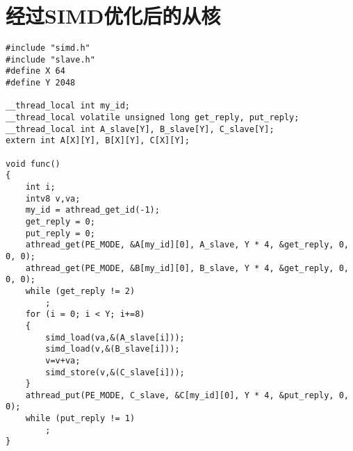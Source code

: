 \section{经过SIMD优化后的从核}\label{apdx:优化后的第一个程序从核}
\begin{lstlisting}
#include "simd.h"
#include "slave.h"
#define X 64
#define Y 2048

__thread_local int my_id;
__thread_local volatile unsigned long get_reply, put_reply;
__thread_local int A_slave[Y], B_slave[Y], C_slave[Y];
extern int A[X][Y], B[X][Y], C[X][Y];

void func()
{
    int i;
    intv8 v,va;
    my_id = athread_get_id(-1);
    get_reply = 0;
    put_reply = 0;
    athread_get(PE_MODE, &A[my_id][0], A_slave, Y * 4, &get_reply, 0, 0, 0);
    athread_get(PE_MODE, &B[my_id][0], B_slave, Y * 4, &get_reply, 0, 0, 0);
    while (get_reply != 2)
        ;
    for (i = 0; i < Y; i+=8)
    {
        simd_load(va,&(A_slave[i]));
        simd_load(v,&(B_slave[i]));
        v=v+va;
        simd_store(v,&(C_slave[i]));
    }
    athread_put(PE_MODE, C_slave, &C[my_id][0], Y * 4, &put_reply, 0, 0);
    while (put_reply != 1)
        ;
}
\end{lstlisting}

